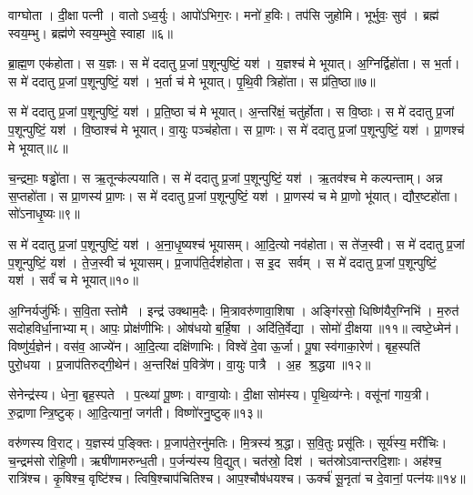 वाग्घोता। दी॒क्षा पत्नी। वातोऽध्व॒र्युः। आपो॑ऽभिग॒रः। मनो॑ ह॒विः। तप॑सि जुहोमि। भूर्भुवः॒ सुव॑। ब्रह्म॑ स्वय॒म्भु। ब्रह्म॑णे स्वय॒म्भुवे॒ स्वाहा॥६॥
\anuvakamend[वाग्घोता॒ नव॑]

ब्रा॒ह्म॒ण एक॑होता। स य॒ज्ञः। स मे॑ ददातु प्र॒जां प॒शून्पुष्टिं॒ यश॑। य॒ज्ञश्च॑ मे भूयात्। अ॒ग्निर्द्विहो॑ता। स भ॒र्ता। स मे॑ ददातु प्र॒जां प॒शून्पुष्टिं॒ यश॑। भ॒र्ता च॑ मे भूयात्। पृ॒थि॒वी त्रिहो॑ता। स प्र॑ति॒ष्ठा॥७॥

स मे॑ ददातु प्र॒जां प॒शून्पुष्टिं॒ यश॑। प्र॒ति॒ष्ठा च॑ मे भूयात्। अ॒न्तरि॑क्षं॒ चतु॑र्\mbox{}होता। स वि॒ष्ठाः। स मे॑ ददातु प्र॒जां प॒शून्पुष्टिं॒ यश॑। वि॒ष्ठाश्च॑ मे भूयात्। वा॒युः पञ्च॑होता। स प्रा॒णः। स मे॑ ददातु प्र॒जां प॒शून्पुष्टिं॒ यश॑। प्रा॒णश्च॑ मे भूयात्॥८॥

च॒न्द्रमाः॒ षड्ढो॑ता। स ऋ॒तून्क॑ल्पयाति। स मे॑ ददातु प्र॒जां प॒शून्पुष्टिं॒ यश॑। ऋ॒तव॑श्च मे कल्पन्ताम्। अन्न स॒प्तहो॑ता। स प्रा॒णस्य॑ प्रा॒णः। स मे॑ ददातु प्र॒जां प॒शून्पुष्टिं॒ यश॑। प्रा॒णस्य॑ च मे प्रा॒णो भू॑यात्। द्यौर॒ष्टहो॑ता। सो॑ऽनाधृ॒ष्यः॥९॥

स मे॑ ददातु प्र॒जां प॒शून्पुष्टिं॒ यश॑। अ॒ना॒धृ॒ष्यश्च॑ भूयासम्। आ॒दि॒त्यो नव॑होता। स ते॑ज॒स्वी। स मे॑ ददातु प्र॒जां प॒शून्पुष्टिं॒ यश॑। ते॒ज॒स्वी च॑ भूयासम्। प्र॒जाप॑ति॒र्दश॑होता। स इ॒द सर्वम्। स मे॑ ददातु प्र॒जां प॒शून्पुष्टिं॒ यश॑। सर्वं॑ च मे भूयात्॥१०॥
\anuvakamend[प्र॒ति॒ष्ठा प्रा॒णश्च॑ मे भूयादनाधृ॒ष्यः सर्वं॑ च मे भूयात्]

अ॒ग्निर्यजु॑र्भिः। स॒वि॒ता स्तोमै। इन्द्र॑ उक्थाम॒दैः। मि॒त्रावरु॑णा\-वा॒शिषा। अङ्गि॑रसो॒ धिष्णि॑यैर॒ग्निभि॑। म॒रुत॑ सदोहविर्धा॒नाभ्याम्। आपः॒ प्रोक्ष॑णीभिः। ओष॑धयो ब॒र्\mbox{}हि॒षा। अदि॑ति॒र्वेद्या। सोमो॑ दी॒क्षया॥११॥
त्वष्टे॒ध्मेन॑। विष्णु॑र्\mbox{}य॒ज्ञेन॑। वस॑व॒ आज्ये॑न। आ॒दि॒त्या दक्षि॑णाभिः। विश्वे॑ दे॒वा ऊ॒र्जा। पू॒षा स्व॑गाका॒रेण॑। बृह॒स्पति॑ पुरो॒धया। प्र॒जाप॑तिरुद्गी॒थेन॑। अ॒न्तरि॑क्षं प॒वित्रे॑ण। वा॒युः पात्रै। अ॒ह श्र॒द्धया॥१२॥
\anuvakamend[दी॒क्षया॒ पात्रै॒रेकं॑ च]

सेनेन्द्र॑स्य। धेना॒ बृह॒स्पते। प॒त्थ्या॑ पू॒ष्णः। वाग्वा॒योः। दी॒क्षा सोम॑स्य। पृ॒थि॒व्य॑ग्नेः। वसू॑नां  गाय॒त्री। रु॒द्राणान्त्रि॒ष्टुक्। आ॒दि॒त्यानां॒ जग॑ती। विष्णो॑रनु॒ष्टुक्॥१३॥%

वरु॑णस्य वि॒राट्। य॒ज्ञस्य॑ प॒ङ्क्तिः। प्र॒जाप॑ते॒रनु॑मतिः। मि॒त्रस्य॑ श्र॒द्धा। स॒वि॒तुः प्रसू॑तिः। सूर्य॑स्य॒ मरी॑चिः। च॒न्द्रम॑सो रोहि॒णी। ऋषी॑णामरुन्ध॒ती। प॒र्जन्य॑स्य वि॒द्युत्। चत॑स्रो॒ दिश॑। चत॑स्रोऽवान्तरदि॒शाः। अह॑श्च॒ रात्रि॑श्च। कृ॒षिश्च॒ वृष्टि॑श्च। त्विषि॒श्चाप॑चितिश्च। आप॒श्चौष॑धयश्च। ऊर्क्च॑ सू॒नृता॑ च दे॒वानां॒ पत्न॑यः॥१४॥%
\anuvakamend[अ॒नु॒ष्टुग्दिशः॒ षट्च॑]

